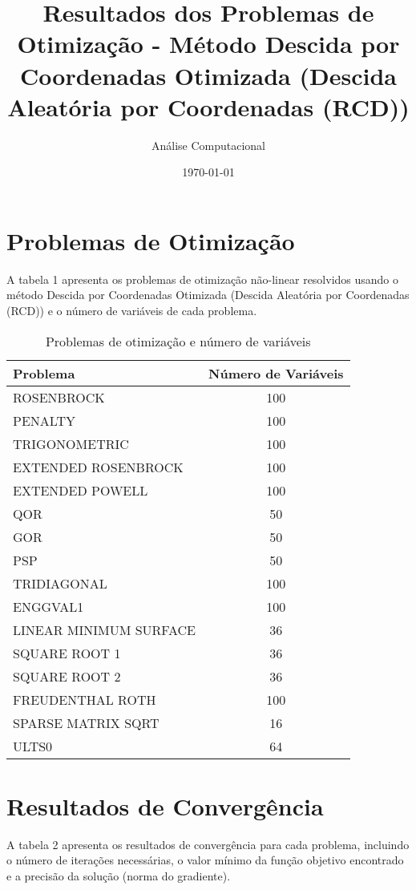 \documentclass[12pt]{article}
\title{Resultados dos Problemas de Otimização - Método Descida por Coordenadas Otimizada (Descida Aleatória por Coordenadas (RCD))}
\author{Análise Computacional}
\date{\today}
\begin{document}
\maketitle

\section{Problemas de Otimização}

A tabela 1 apresenta os problemas de otimização não-linear resolvidos usando o método Descida por Coordenadas Otimizada (Descida Aleatória por Coordenadas (RCD)) e o número de variáveis de cada problema.

\begin{table}[h!]
\centering
\caption{Problemas de otimização e número de variáveis}
\label{tab:problemas_variáveis}
\begin{tabular}{@{}|lc|@{}}
\toprule
\textbf{Problema} & \textbf{Número de Variáveis} \\
\midrule
ROSENBROCK & 100 \\
PENALTY & 100 \\
TRIGONOMETRIC & 100 \\
EXTENDED ROSENBROCK & 100 \\
EXTENDED POWELL & 100 \\
QOR & 50 \\
GOR & 50 \\
PSP & 50 \\
TRIDIAGONAL & 100 \\
ENGGVAL1 & 100 \\
LINEAR MINIMUM SURFACE & 36 \\
SQUARE ROOT 1 & 36 \\
SQUARE ROOT 2 & 36 \\
FREUDENTHAL ROTH & 100 \\
SPARSE MATRIX SQRT & 16 \\
ULTS0 & 64 \\
\bottomrule
\end{tabular}
\end{table}

\section{Resultados de Convergência}

A tabela 2 apresenta os resultados de convergência para cada problema, incluindo o número de iterações necessárias, o valor mínimo da função objetivo encontrado e a precisão da solução (norma do gradiente).
\end{document}
